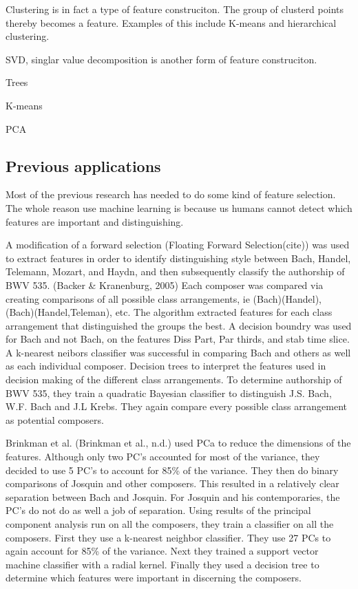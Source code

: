 \documentclass[12pt,twoside]{reedthesis}
\theoremstyle{definition}
\theoremstyle{definition}
\theoremstyle{definition}
\theoremstyle{remark}
\begin{document}
Clustering is in fact a type of feature construciton. The group of
clusterd points thereby becomes a feature. Examples of this include
K-means and hierarchical clustering.

SVD, singlar value decomposition is another form of feature
construciton.

Trees

K-means

PCA

\subsection{Previous applications}\label{previous-applications}

Most of the previous research has needed to do some kind of feature
selection. The whole reason use machine learning is because us humans
cannot detect which features are important and distinguishing.

A modification of a forward selection (Floating Forward Selection(cite))
was used to extract features in order to identify distinguishing style
between Bach, Handel, Telemann, Mozart, and Haydn, and then subsequently
classify the authorship of BWV 535. (Backer \& Kranenburg, 2005) Each
composer was compared via creating comparisons of all possible class
arrangements, ie (Bach)(Handel), (Bach)(Handel,Teleman), etc. The
algorithm extracted features for each class arrangement that
distinguished the groups the best. A decision boundry was used for Bach
and not Bach, on the features Diss Part, Par thirds, and stab time
slice. A k-nearest neibors classifier was successful in comparing Bach
and others as well as each individual composer. Decision trees to
interpret the features used in decision making of the different class
arrangements. To determine authorship of BWV 535, they train a quadratic
Bayesian classifier to distinguish J.S. Bach, W.F. Bach and J.L Krebs.
They again compare every possible class arrangement as potential
composers.

Brinkman et al. (Brinkman et al., n.d.) used PCa to reduce the
dimensions of the features. Although only two PC's accounted for most of
the variance, they decided to use 5 PC's to account for 85\% of the
variance. They then do binary comparisons of Josquin and other
composers. This resulted in a relatively clear separation between Bach
and Josquin. For Josquin and his contemporaries, the PC's do not do as
well a job of separation. Using results of the principal component
analysis run on all the composers, they train a classifier on all the
composers. First they use a k-nearest neighbor classifier. They use 27
PCs to again account for 85\% of the variance. Next they trained a
support vector machine classifier with a radial kernel. Finally they
used a decision tree to determine which features were important in
discerning the composers.
\end{document}
